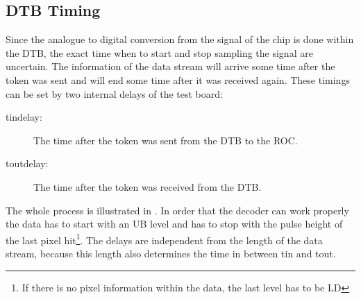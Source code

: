 \documentclass[british,11pt,a4paper]{memoir}
\begin{document}
\subsection{\ac{DTB} Timing}
Since the analogue to digital conversion from the signal of the chip is done within the \ac{DTB}, the exact time when to start and stop sampling the signal are uncertain. The information of the data stream will arrive some time after the token was sent and will end some time after it was received again. These timings can be set by two internal delays of the test board:
\begin{description}
	\item[tindelay:] The time after the token was sent from the \ac{DTB} to the \ac{ROC}. 
	\item[toutdelay:] The time after the token was received from the \ac{DTB}.
\end{description}
The whole process is illustrated in . In order that the decoder can work properly the data has to start with an \ac{UB} level and has to stop with the pulse height of the last pixel hit\footnote{If there is no pixel information within the data, the last level has to be \ac{LD}}. The delays are independent from the length of the data stream, because this length also determines the time in between tin and tout. 
\end{document}
